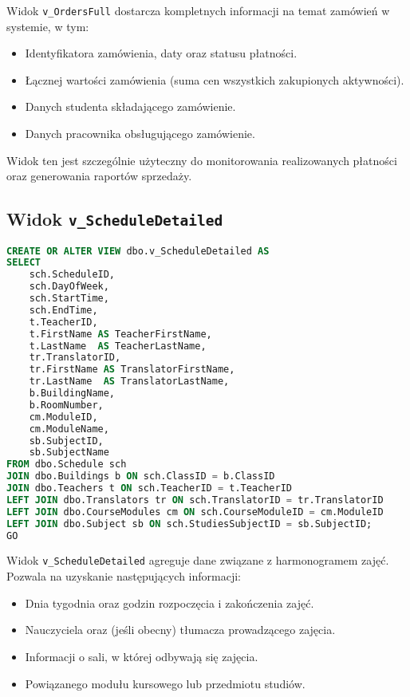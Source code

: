 \documentclass[12pt]{article}
\begin{document}
\noindent Widok \texttt{v\_OrdersFull} dostarcza kompletnych informacji na temat zamówień w systemie, w tym:
\begin{itemize}
    \item Identyfikatora zamówienia, daty oraz statusu płatności.
    \item Łącznej wartości zamówienia (suma cen wszystkich zakupionych aktywności).
    \item Danych studenta składającego zamówienie.
    \item Danych pracownika obsługującego zamówienie.
\end{itemize}
\noindent Widok ten jest szczególnie użyteczny do monitorowania realizowanych płatności oraz generowania raportów sprzedaży.


\subsection{Widok \texttt{v\_ScheduleDetailed}}

\begin{lstlisting}[language=SQL]
CREATE OR ALTER VIEW dbo.v_ScheduleDetailed AS
SELECT
    sch.ScheduleID,
    sch.DayOfWeek,
    sch.StartTime,
    sch.EndTime,
    t.TeacherID,
    t.FirstName AS TeacherFirstName,
    t.LastName  AS TeacherLastName,
    tr.TranslatorID,
    tr.FirstName AS TranslatorFirstName,
    tr.LastName  AS TranslatorLastName,
    b.BuildingName,
    b.RoomNumber,
    cm.ModuleID,
    cm.ModuleName,
    sb.SubjectID,
    sb.SubjectName
FROM dbo.Schedule sch
JOIN dbo.Buildings b ON sch.ClassID = b.ClassID
JOIN dbo.Teachers t ON sch.TeacherID = t.TeacherID
LEFT JOIN dbo.Translators tr ON sch.TranslatorID = tr.TranslatorID
LEFT JOIN dbo.CourseModules cm ON sch.CourseModuleID = cm.ModuleID
LEFT JOIN dbo.Subject sb ON sch.StudiesSubjectID = sb.SubjectID;
GO
\end{lstlisting}

\noindent Widok \texttt{v\_ScheduleDetailed} agreguje dane związane z harmonogramem zajęć. Pozwala na uzyskanie następujących informacji:
\begin{itemize}
    \item Dnia tygodnia oraz godzin rozpoczęcia i zakończenia zajęć.
    \item Nauczyciela oraz (jeśli obecny) tłumacza prowadzącego zajęcia.
    \item Informacji o sali, w której odbywają się zajęcia.
    \item Powiązanego modułu kursowego lub przedmiotu studiów.
\end{itemize}
\end{document}
